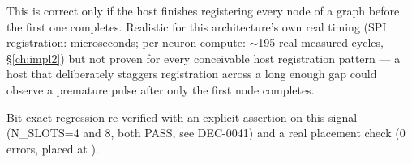 \begin{fnnote}
This is correct only if the host finishes registering every node of a
graph before the first one completes. Realistic for this
architecture's own real timing (SPI registration: microseconds;
per-neuron compute: $\sim$195 real measured cycles, \S\ref{ch:impl2})
but not proven for every conceivable host registration pattern --- a
host that deliberately staggers registration across a long enough gap
could observe a premature  pulse after only
the first node completes.
\end{fnnote}

Bit-exact regression re-verified with an explicit assertion on this
signal (N\_SLOTS=4 and 8, both PASS, see 
DEC-0041) and a real  placement check (0 errors,
 placed at ).
